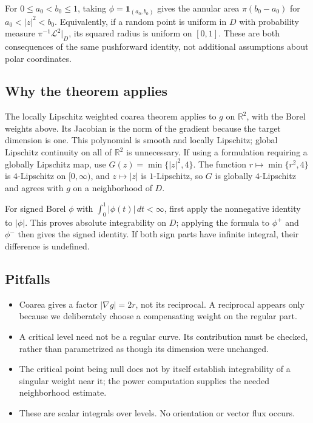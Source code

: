 \documentclass[
  11pt,
]{article}
\providecommand{\tightlist}{%
  \setlength{\itemsep}{0pt}\setlength{\parskip}{0pt}}
\begin{document}
For \(0\leq a_0<b_0\leq1\), taking \(\phi=\mathbf1_{(a_0,b_0)}\) gives
the annular area \(\pi(b_0-a_0)\) for \(a_0<|z|^2<b_0\). Equivalently,
if a random point is uniform in \(D\) with probability measure
\(\pi^{-1}\mathcal L^2|_D\), its squared radius is uniform on \([0,1]\).
These are both consequences of the same pushforward identity, not
additional assumptions about polar coordinates.

\subsection{Why the theorem applies}\label{why-the-theorem-applies-11}

The locally Lipschitz weighted coarea theorem applies to \(g\) on
\(\mathbb R^2\), with the Borel weights above. Its Jacobian is the norm
of the gradient because the target dimension is one. This polynomial is
smooth and locally Lipschitz; global Lipschitz continuity on all of
\(\mathbb R^2\) is unnecessary. If using a formulation requiring a
globally Lipschitz map, use \(G(z)=\min\{|z|^2,4\}\). The function
\(r\mapsto\min\{r^2,4\}\) is \(4\)-Lipschitz on \([0,\infty)\), and
\(z\mapsto|z|\) is \(1\)-Lipschitz, so \(G\) is globally \(4\)-Lipschitz
and agrees with \(g\) on a neighborhood of \(D\).

For signed Borel \(\phi\) with \(\int_0^1|\phi(t)|\,dt<\infty\), first
apply the nonnegative identity to \(|\phi|\). This proves absolute
integrability on \(D\); applying the formula to \(\phi^+\) and
\(\phi^-\) then gives the signed identity. If both sign parts have
infinite integral, their difference is undefined.

\subsection{Pitfalls}\label{pitfalls-11}

\begin{itemize}
\tightlist
\item
  Coarea gives a factor \(|\nabla g|=2r\), not its reciprocal. A
  reciprocal appears only because we deliberately choose a compensating
  weight on the regular part.
\item
  A critical level need not be a regular curve. Its contribution must be
  checked, rather than parametrized as though its dimension were
  unchanged.
\item
  The critical point being null does not by itself establish
  integrability of a singular weight near it; the power computation
  supplies the needed neighborhood estimate.
\item
  These are scalar integrals over levels. No orientation or vector flux
  occurs.
\end{itemize}
\end{document}
